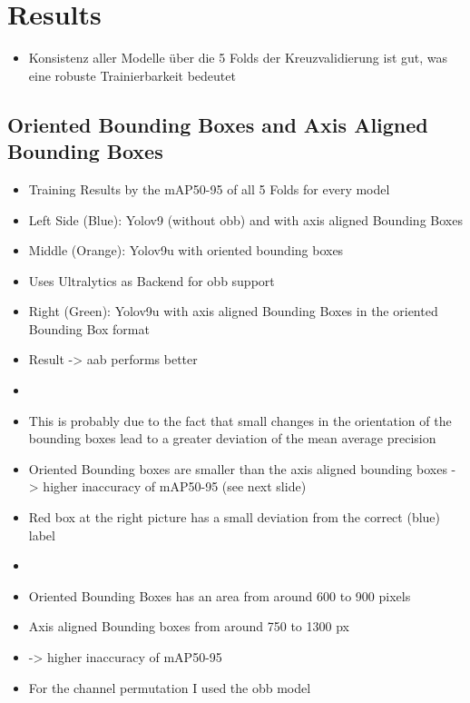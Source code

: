 \chapter{Results}
\label{ch:results}

\begin{itemize}
    \item Konsistenz aller Modelle über die 5 Folds der Kreuzvalidierung ist gut, was eine robuste Trainierbarkeit bedeutet
\end{itemize}
\section{Oriented Bounding Boxes and Axis Aligned Bounding Boxes}
\begin{itemize}
    \item Training Results by the mAP50-95 of all 5 Folds for every model 
    \item Left Side (Blue): Yolov9 (without obb) and with axis aligned Bounding Boxes
    \item Middle (Orange): Yolov9u with oriented bounding boxes
    \item Uses Ultralytics as Backend for obb support
    \item Right (Green): Yolov9u with axis aligned Bounding Boxes in the oriented Bounding Box format
    \item Result -> aab performs better
    \item {}
    \item This is probably due to the fact that small changes in the orientation of the bounding boxes lead to a greater deviation of the mean average precision 
    \item Oriented Bounding boxes are smaller than the axis aligned bounding boxes -> higher inaccuracy of mAP50-95 (see next slide)
    \item Red box at the right picture has a small deviation from the correct (blue) label
\end{itemize}
\begin{itemize}
    \item {}
    \item Oriented Bounding Boxes has an area from around 600 to 900 pixels 
    \item Axis aligned Bounding boxes from around 750 to 1300 px
    \item-> higher inaccuracy of mAP50-95

    \item For the channel permutation I used the obb model

\end{itemize}

